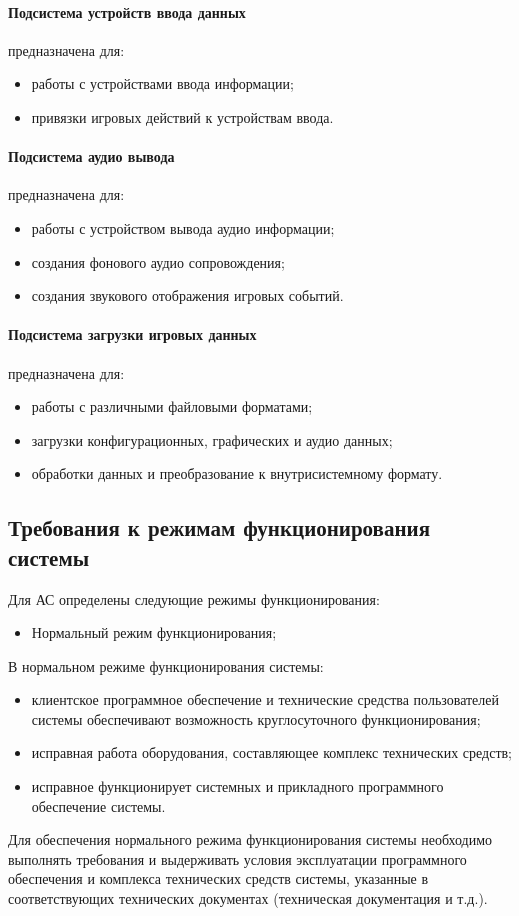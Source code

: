 \paragraph{Подсистема устройств ввода данных}
предназначена для:
\begin{itemize}
    \item работы с устройствами ввода информации;
    \item привязки игровых действий к устройствам ввода.
\end{itemize}

\paragraph{Подсистема аудио вывода}
предназначена для:
\begin{itemize}
    \item работы с устройством вывода аудио информации;
    \item создания фонового аудио сопровождения;
    \item создания звукового отображения игровых событий.
\end{itemize}

\paragraph{Подсистема загрузки игровых данных}
предназначена для:
\begin{itemize}
    \item работы с различными файловыми форматами;
    \item загрузки конфигурационных, графических и аудио данных;
    \item обработки данных и преобразование к внутрисистемному формату.
\end{itemize}

\subsection{Требования к режимам функционирования системы}
Для АС определены следующие режимы функционирования:
\begin{itemize}
    \item Нормальный режим функционирования;
\end{itemize}
В нормальном режиме функционирования системы:
\begin{itemize}
    \item клиентское программное обеспечение и технические средства пользователей системы 
        обеспечивают возможность круглосуточного функционирования;
    \item исправная работа оборудования, составляющее комплекс технических средств;
    \item исправное функционирует системных и прикладного программного обеспечение системы.
\end{itemize}
Для обеспечения нормального режима функционирования системы необходимо выполнять требования и 
выдерживать условия эксплуатации программного обеспечения и комплекса технических средств системы, 
указанные в соответствующих технических документах (техническая документация и т.д.).

